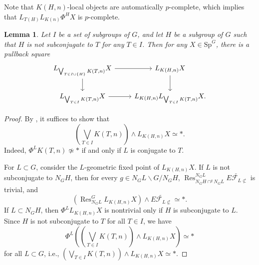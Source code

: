 \documentclass{amsart}
\theoremstyle{plain}
\newtheorem{lemma}[theorem]{Lemma}
\theoremstyle{definition}
\theoremstyle{remark}
\begin{document}
    Note that $K(H,n)$-local objects are automatically $p$-complete, which implies that $L_{T(H)}L_{K(n)}\Phi^H X$ is $p$-complete.

\begin{lemma}\label{lem:step by step}
    Let $I$ be a set of subgroups of $G$, and let $H$ be a subgroup of $G$ such that $H$ is not subconjugate to $T$ for any $T\in I$. Then for any $X\in \mathrm{Sp}^G$, there is a pullback square
    \[
    \begin{tikzcd}
        L_{\bigvee_{T\in I\cup\{H\}}K(T,n)}X \arrow[r]\arrow[d] & L_{K(H,n)} X\arrow[d]\\
        L_{\bigvee_{T\in I}K(T,n)}X \arrow[r] & L_{K(H,n)}L_{\bigvee_{T\in I}K(T,n)}X.
    \end{tikzcd}
    \]
\end{lemma}
\begin{proof}
    By , it suffices to show that 
    \[
    (\bigvee_{T\in I}K(T,n)) \wedge L_{K(H,n)} X\simeq \ast. 
    \]
    Indeed, $\Phi^L K(T,n)\not\simeq \ast$ if and only if $L$ is conjugate to $T$. 
    
    For $L\subset G$, consider the $L$-geometric fixed point of $L_{K(H,n)}X$. If $L$ is not subconjugate to $N_G H$, then for every $g\in N_G L\backslash G/N_G H$, $\operatorname{Res}_{N_GH\cap^g N_G L}^{N_G L}\widetilde{E\mathcal F_{L\not\subset}}$ is trivial, and
    \[
        (\operatorname{Res}_{N_G L}^{G} L_{K(H,n)}X)\wedge \widetilde{E\mathcal F_{L\not\subset}}  \simeq \ast.
    \]
    If $L\subset N_G H$, then $\Phi^L L_{K(H,n)}X$ is nontrivial only if $H$ is subconjugate to $L$. Since $H$ is not subconjugate to $T$ for all $T\in I$, we have 
    \[
    \Phi^L((\bigvee_{T\in I}K(T,n)) \wedge L_{K(H,n)} X)\simeq \ast
    \]
    for all $L\subset G$, i.e., $(\bigvee_{T\in I}K(T,n)) \wedge L_{K(H,n)} X\simeq \ast$.
\end{proof}
\end{document}
